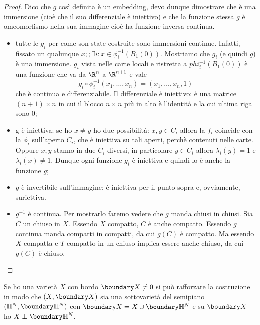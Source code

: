 \begin{proof}
 
 Dico che $g$ così definita è un embedding, devo dunque dimostrare che è una immersione (cioè che il suo differenziale è iniettivo) e che la funzione stessa $g$ è omeomorfismo nella sua immagine cioè ha funzione inversa continua.
 
\begin {itemize}
  \item tutte le $g_{i}$ per come son state costruite sono immersioni continue. Infatti, fissato un qualunque $x;;\exists i: x\in \phi_i^{-1}(B_1(0))$. Mostriamo che $g_i$ (e quindi $g$) è una immersione. $g_i$ vista nelle carte locali e ristretta a $phi_i^{-1}(B_1(0))$ è una funzione che va da $\R^n$ a $\R^{n+1}$ e vale
\begin{equation*}
   g_i\circ \phi_i^{-1}(x_1,\dots, x_n)=(x_1,\dots, x_n, 1)
\end{equation*}
che è continua e differenziabile. Il differenziale è iniettivo: è una matrice $(n+1)\times n$ in cui il blocco $n\times n$ più in alto è l'identità e la cui ultima riga sono $0$;
  \item g è iniettiva: se ho $x \neq y$  ho due possibilità: $x, y \in C_{i}$ allora la $f_i$ coincide con la $\phi_i$ sull'aperto $C_{i}$, che è iniettiva su tali aperti, perchè contenuti nelle carte. 
  Oppure $x, y$ stanno in due $C_i$ diversi, in particolare $y \in C_{i}$ allora $\lambda_{i}(y) = 1$ e $\lambda_{i}(x) \neq 1$. Dunque ogni funzione $g_i$ è iniettiva e quindi lo è anche la funzione $g$;
  \item $g$ è invertibile sull'immagine: è iniettiva per il punto sopra e, ovviamente, suriettiva.
  \item $g^{-1}$ è continua. Per mostrarlo faremo vedere che $g$ manda chiusi in chiusi. Sia $C$ un chiuso in $X$. Essendo $X$ compatto, $C$ è anche compatto. Essendo $g$ continua manda compatti in compatti, da cui $g(C)$ è compatto. Ma essendo $X$ compatta e $T$ compatto in un chiuso implica essere anche chiuso, da cui $g(C)$ è chiuso.
  \qedhere
 \end {itemize}
\end{proof}

Se ho una varietà $X$ con bordo $\boundary X \neq 0$ si può rafforzare la costruzione in modo che $(X, \boundary X)$ sia una sottovarietà del semipiano 
$(\mathbb{H}^{N}, \boundary \mathbb{H}^{N})$ con $\boundary X = X \cup \boundary \mathbb{H}^{N}$ e su $\boundary X$ ho $X \perp \boundary \mathbb{H}^{N}$.

